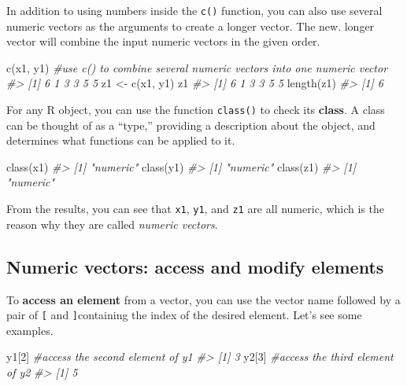 \documentclass[
]{book}
\newenvironment{Shaded}{\begin{snugshade}}{\end{snugshade}}
\newcommand{\CommentTok}[1]{\textcolor[rgb]{0.56,0.35,0.01}{\textit{#1}}}
\newcommand{\DecValTok}[1]{\textcolor[rgb]{0.00,0.00,0.81}{#1}}
\newcommand{\FunctionTok}[1]{\textcolor[rgb]{0.00,0.00,0.00}{#1}}
\newcommand{\NormalTok}[1]{#1}
\newcommand{\OtherTok}[1]{\textcolor[rgb]{0.56,0.35,0.01}{#1}}
\begin{document}
In addition to using numbers inside the \texttt{c()} function, you can also use several numeric vectors as the arguments to create a longer vector. The new. longer vector will combine the input numeric vectors in the given order.

\begin{Shaded}
\begin{Highlighting}[]
\FunctionTok{c}\NormalTok{(x1, y1)          }\CommentTok{\#use c() to combine several numeric vectors into one numeric vector}
\CommentTok{\#\textgreater{} [1] 6 1 3 3 5 5}
\NormalTok{z1 }\OtherTok{\textless{}{-}} \FunctionTok{c}\NormalTok{(x1, y1)}
\NormalTok{z1}
\CommentTok{\#\textgreater{} [1] 6 1 3 3 5 5}
\FunctionTok{length}\NormalTok{(z1)}
\CommentTok{\#\textgreater{} [1] 6}
\end{Highlighting}
\end{Shaded}

For any R object, you can use the function \texttt{class()} to check its \textbf{class}. A class can be thought of as a ``type,'' providing a description about the object, and determines what functions can be applied to it.

\begin{Shaded}
\begin{Highlighting}[]
\FunctionTok{class}\NormalTok{(x1)}
\CommentTok{\#\textgreater{} [1] "numeric"}
\FunctionTok{class}\NormalTok{(y1)}
\CommentTok{\#\textgreater{} [1] "numeric"}
\FunctionTok{class}\NormalTok{(z1)}
\CommentTok{\#\textgreater{} [1] "numeric"}
\end{Highlighting}
\end{Shaded}

From the results, you can see that \texttt{x1}, \texttt{y1}, and \texttt{z1} are all numeric, which is the reason why they are called \emph{numeric vectors}.

\hypertarget{numeric-vectors-access-and-modify-elements}{%
\subsection{Numeric vectors: access and modify elements}\label{numeric-vectors-access-and-modify-elements}}

To \textbf{access an element} from a vector, you can use the vector name followed by a pair of \texttt{{[}} and \texttt{{]}}containing the index of the desired element. Let's see some examples.

\begin{Shaded}
\begin{Highlighting}[]
\NormalTok{y1[}\DecValTok{2}\NormalTok{]     }\CommentTok{\#access the second element of y1}
\CommentTok{\#\textgreater{} [1] 3}
\NormalTok{y2[}\DecValTok{3}\NormalTok{]     }\CommentTok{\#access the third element of y2}
\CommentTok{\#\textgreater{} [1] 5}
\end{Highlighting}
\end{Shaded}
\end{document}
